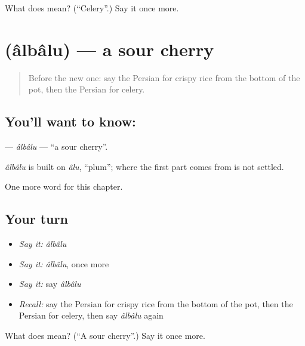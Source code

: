 \begin{tcolorbox}[breakable,colback=teal!4,colframe=teal!35!black,title={Before you move on}]
What does  mean? (\textquotedblleft{}Celery\textquotedblright{}.) Say it once more.
\end{tcolorbox}
\section[\texorpdfstring{\fa{آلبالو} (âlbâlu)}{آلبالو (âlbâlu)}]{ (âlbâlu) — a sour cherry}

\label{lesson:FA-C249-albalu}



\begin{quote}
Before the new one: say the Persian for crispy rice from the bottom of the pot, then the Persian for celery.
\end{quote}

\subsection*{You'll want to know: }
\textbf{} — \emph{âlbâlu} — \textquotedblleft{}a sour cherry\textquotedblright{}.

\begin{cousinweb}
\emph{âlbâlu} is built on \emph{âlu}, \textquotedblleft{}plum\textquotedblright{}; where the first part comes from is not settled.
\end{cousinweb}

\begin{grammarlens}[title={What you've built}]
One more word for this chapter.
\end{grammarlens}

\subsection*{Your turn}
\begin{itemize}
\raggedright
  \item \emph{Say it:} \emph{âlbâlu}
  \item \emph{Say it:} \emph{âlbâlu}, once more
  \item \emph{Say it:} say \emph{âlbâlu}
  \item \emph{Recall:} say the Persian for crispy rice from the bottom of the pot, then the Persian for celery, then say \emph{âlbâlu} again
\end{itemize}

\begin{tcolorbox}[breakable,colback=teal!4,colframe=teal!35!black,title={Before you move on}]
What does  mean? (\textquotedblleft{}A sour cherry\textquotedblright{}.) Say it once more.
\end{tcolorbox}
